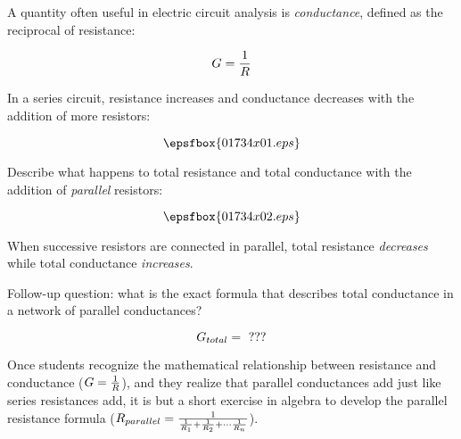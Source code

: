 

A quantity often useful in electric circuit analysis is {\it conductance}, defined as the reciprocal of resistance:

$$G = {1 \over R}$$

In a series circuit, resistance increases and conductance decreases with the addition of more resistors:

$$\epsfbox{01734x01.eps}$$

Describe what happens to total resistance and total conductance with the addition of {\it parallel} resistors:

$$\epsfbox{01734x02.eps}$$







When successive resistors are connected in parallel, total resistance {\it decreases} while total conductance {\it increases}.

\vskip 10pt

Follow-up question: what is the exact formula that describes total conductance in a network of parallel conductances?

$$G_{total} = \hbox{ ???}$$







Once students recognize the mathematical relationship between resistance and conductance ($G = {1 \over R}$), and they realize that parallel conductances add just like series resistances add, it is but a short exercise in algebra to develop the parallel resistance formula ($R_{parallel} = {1 \over { {1 \over R_1} + {1 \over R_2} + \cdots {1 \over R_n} } }$).




